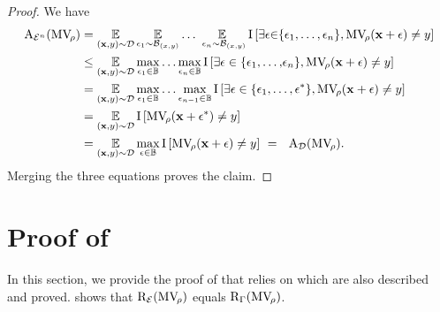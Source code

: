 \begin{noaddcontents}
\begin{proof}
We have
\begin{align*}
    \RiskM_{\Dpert^{{n}}}(\MVQ)
    &= \EE_{(\x,\y)\sim\D} \EE_{\epsilon_1\sim\DX} {\ldots}\EE_{\ \epsilon_{n}\sim\DX}\indic\LB\exists\epsilon{\in}\{\epsilon_1,\ldots, \epsilon_{n}\}, \MVQ(\x+\epsilon)\ne \y\RB\\
    &\le \EE_{(\x,\y)\sim\D} \max_{\epsilon_1\in\Xpert}\ldots\max_{\epsilon_{n}\in\Xpert}\indic \LB\exists\epsilon\in\{\epsilon_1,{\ldots,}\epsilon_{n}\}, \MVQ(\x+\epsilon)\ne \y\RB\\
    &= \EE_{(\x,\y)\sim\D} \max_{\epsilon_1\in\Xpert}{\ldots} \max_{\epsilon_{{n}-1}\in\Xpert} \indic \LB\exists\epsilon\in\{\epsilon_1,\ldots, \epsilon^*\}, \MVQ(\x+\epsilon)\ne \y\RB\\
    &= \EE_{(\x,\y)\sim\D} \indic \LB \MVQ(\x+\epsilon^*)\ne \y\RB\\
    &= \EE_{(\x,\y)\sim\D} \max_{\epsilon\in\Xpert}\indic \LB \MVQ(\x+\epsilon)\ne \y\RB\ =\  \ \RiskA_{\D}(\MVQ).
\end{align*}
Merging the three equations proves the claim.
\end{proof}

\section{Proof of }
\label{ap:mv-robustness:sec:proof-avg-worst-risk}

In this section, we provide the proof of  that relies on  which are also described and proved.
 shows that $\text{R}_{{\mathcal{E}}}(\text{MV}_{\!\rho})$ equals $\text{R}_{\Gamma}(\text{MV}_{\!\rho})$.


\end{noaddcontents}
